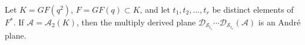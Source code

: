 Let $K = GF(q^2)$, $F = GF(q) \subset K$, and let $t_1, t_2, \dots, t_r$ be distinct elements of $F^*$. If $\mathcal{A} = \mathcal{A}_2(K)$, then the multiply derived plane $\mathcal{D}_{\mathcal{S}_{t_1}} \cdots \mathcal{D}_{\mathcal{S}_{t_r}}(\mathcal{A})$ is an Andr\'{e} plane.
